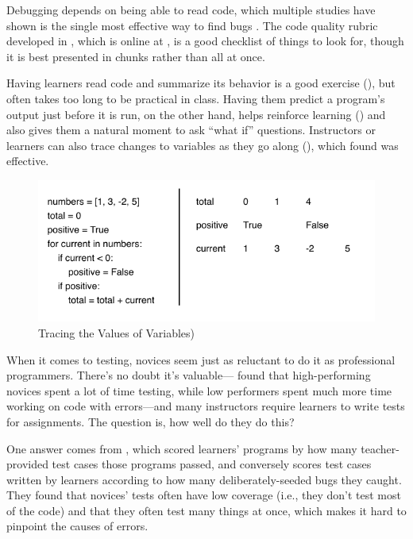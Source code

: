 Debugging depends on being able to read code, which multiple studies
have shown is the single most effective way to find bugs
\cite{Basi1987,Keme2009,Bacc2013}.  The code quality rubric developed
in \cite{Steg2014,Steg2016a}, which is online at \cite{Steg2016b}, is
a good checklist of things to look for, though it is best presented in
chunks rather than all at once.

Having learners read code and summarize its behavior is a good
exercise (), but often takes too long
to be practical in class.  Having them predict a program's output just
before it is run, on the other hand, helps reinforce learning
() and also gives them a natural moment
to ask ``what if'' questions.  Instructors or learners can also trace
changes to variables as they go along (), which
\cite{Cunn2017} found was effective.

\begin{figure}
\centering
\includegraphics{../docs/fig/sketching-variables.pdf}
\caption{Tracing the Values of Variables)}
\label{f:pck-sketch}
\end{figure}

When it comes to testing, novices seem just as reluctant to do it as
professional programmers.  There's no doubt it's
valuable---\cite{Cart2017} found that high-performing novices spent a
lot of time testing, while low performers spent much more time working
on code with errors---and many instructors require learners to write
tests for assignments.  The question is, how well do they do this?

One answer comes from \cite{Bria2015}, which scored learners' programs
by how many teacher-provided test cases those programs passed, and
conversely scores test cases written by learners according to how many
deliberately-seeded bugs they caught.  They found that novices' tests
often have low coverage (i.e., they don't test most of the code) and
that they often test many things at once, which makes it hard to
pinpoint the causes of errors.

